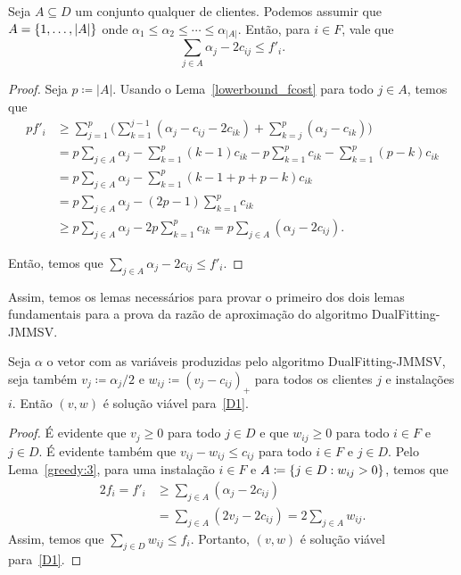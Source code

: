 \begin{lemma}
\label{greedy:3}
Seja $A \subseteq D$ um conjunto qualquer de clientes. Podemos assumir que $A = \{1,\ldots,|A|\}$ onde $\alpha_1 \leq \alpha_2 \leq \cdots \leq \alpha_{|A|}$. Então, para $i \in F$, vale que
\[ \sum_{j \in A}\alpha_j - 2c_{ij} \leq f'_i.
\]
\end{lemma}
\begin{proof}
Seja $p \coloneqq |A|$. Usando o Lema~\ref{lowerbound_fcost} para todo $j \in A$, temos que
\begin{subequations}
\begin{align*}
  p f'_i &\geq \sum_{j=1}^p {\big (} \sum_{k=1}^{j-1} (\alpha_j - c_{ij} - 2c_{ik}) + \sum_{k=j}^p (\alpha_j - c_{ik}) {\big )} \\
  &= p\sum_{j \in A}\alpha_j - \sum_{k=1}^p (k-1)c_{ik} - p\sum_{k=1}^p c_{ik} - \sum_{k=1}^p (p-k) c_{ik} \\
  &= p\sum_{j \in A}\alpha_j - \sum_{k=1}^p (k-1+p+p-k)c_{ik} \\
  &= p\sum_{j \in A}\alpha_j - (2p -1 )\sum_{k=1}^p c_{ik} \\
    &\geq p\sum_{j \in A}\alpha_j - 2p\sum_{k=1}^p c_{ik} = p \sum_{j \in A}( \alpha_j - 2 c_{ij}).
\end{align*}
\end{subequations}

Então, temos que $\sum_{j \in A}\alpha_j - 2c_{ij} \leq f'_i$.

\end{proof}

Assim, temos os lemas necessários para provar o primeiro dos dois lemas fundamentais para a prova da razão de aproximação do algoritmo {\sc DualFitting-JMMSV}.

\begin{lemma}
\label{greedy:4}
Seja $\alpha$ o vetor com as variáveis produzidas pelo algoritmo {\sc DualFitting-JMMSV}, seja também $v_j \coloneqq \alpha_j/2$ e $w_{ij} \coloneqq (v_j - c_{ij})_+$ para todos os clientes $j$ e instalações $i$. Então $(v,w)$ é solução viável para~\eqref{D1}. 
\end{lemma}

\begin{proof}
É evidente que $v_j \geq 0$ para todo $j \in D$ e que $w_{ij} \geq 0$ para todo $i \in F$ e $j \in D$. É evidente também que $v_{ij} - w_{ij} \leq c_{ij}$ para todo $i \in F$ e $j \in D$. Pelo Lema~\ref{greedy:3}, para uma instalação $i\in F$ e $A \coloneqq \{j \in D: w_{ij} > 0\}$, temos que
\begin{subequations}
\begin{align*}
2 f_i = f'_i &\geq \sum_{j \in A} (\alpha_j - 2c_{ij}) \\
 &= \sum_{j \in A}(2v_j - 2c_{ij}) = 2 \sum_{j \in A} w_{ij}.
\end{align*}
\end{subequations}
Assim, temos que $\sum_{j \in D} w_{ij} \leq f_i$. Portanto, $(v,w)$ é solução viável para~\eqref{D1}.
\end{proof}


